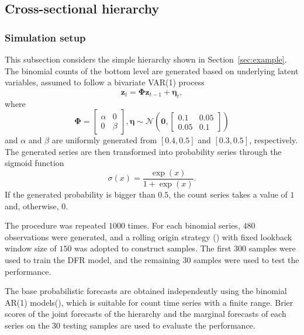 \documentclass[a4paper,review,12pt,authoryear]{elsarticle}
\begin{document}
     \subsection{Cross-sectional hierarchy}
     \label{sec:cross-sectional_simu}
     \subsubsection{Simulation setup}
     This subsection considers the simple hierarchy shown in Section~\ref{sec:example}.
     The binomial counts of the bottom level are generated based on underlying latent variables, assumed to follow a bivariate VAR(1) process
     \[\mathbf{z}_t = \mathbf{\Phi}\mathbf{z}_{t-1}+\boldsymbol{\eta}_t,\]
     where
     \[
       \mathbf{\Phi} = \left[\begin{matrix}
         \alpha & 0 \\
         0 & \beta
       \end{matrix}\right], \boldsymbol{\eta} \sim \mathcal{N}\left(\mathbf{0}, \left[\begin{matrix}
         0.1 & 0.05 \\
         0.05 & 0.1 
       \end{matrix}\right]\right)
     \]
     and $\alpha$ and $\beta$ are uniformly generated from $[0.4, 0.5]$ and $[0.3,0.5]$, respectively. 
     The generated series are then transformed into probability series through the sigmoid function
     \[
     \sigma(x) = \frac{\exp(x)}{1+\exp(x)}.
     \]
     If the generated probability is bigger than $0.5$, the count series takes a value of $1$ and, otherwise, $0$.
     
     The procedure was repeated $1000$ times. 
     For each binomial series, $480$ observations were generated,
     and a rolling origin strategy () with fixed lookback window size of $150$ was adopted to construct samples. 
     The first $300$ samples were used to train the DFR model, and the remaining $30$ samples were used to test the performance.
     
     The base probabilistic forecasts are obtained independently using the binomial AR(1) models(\citealp{weissParameterEstimationBinomial2013}), which is suitable for count time series with a finite range.
     Brier scores of the joint forecasts of the hierarchy and the marginal forecasts of each series on the $30$ testing samples are used to evaluate the performance. 
     
\end{document}
